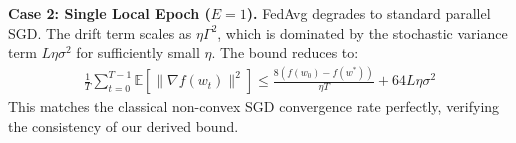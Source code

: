 \documentclass{article}
\begin{document}
\textbf{Case 2: Single Local Epoch ($E = 1$).} FedAvg degrades to standard parallel SGD. The drift term scales as $\eta \Gamma^2$, which is dominated by the stochastic variance term $L \eta \sigma^2$ for sufficiently small $\eta$. The bound reduces to:
\begin{align*}
\frac{1}{T} \sum_{t=0}^{T-1} \mathbb{E}[\|\nabla f(w_t)\|^2] \leq \frac{8(f(w_0) - f(w^*))}{\eta T} + 64 L \eta \sigma^2
\end{align*}
This matches the classical non-convex SGD convergence rate perfectly, verifying the consistency of our derived bound.
\end{document}
